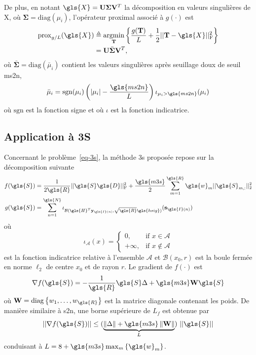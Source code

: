 De plus, en notant $\gls{X}=\mathbf{U}\boldsymbol{\Sigma} \mathbf{V}^T$ la décomposition en valeurs singulières de \gls{X}, où $\boldsymbol{\Sigma} = \mathrm{diag}(\mu_i)$, l'opérateur proximal associé à $g(\cdot)$ est~\cite{cai1956singular}
\begin{align}
    \mathrm{prox}_{g/L}(\gls{X}) &\triangleq \argmin_{\mathbf{T}} 
                                    \left\{ \frac{g(\mathbf{T})}{L} + \frac{1}{2}\frobnorm{\mathbf{T} - \gls{X}} \right\}\\
                               &= {\mathbf{U}} \bar{\boldsymbol{\Sigma}} {\mathbf{V}}^T,
\end{align}
où $\bar{\boldsymbol{\Sigma}} = \mathrm{diag}(\bar{\mu}_i)$ contient les valeurs singulières après seuillage doux de seuil \gls{ms2n}, \ie{}
\begin{equation}
    \bar{\mu}_i = \mathrm{sgn}(\mu_i)\left(|\mu_i|-\frac{\gls{ms2n}}{L}\right)\iota_{\mu_i>\gls{ms2n}}(\mu_i)
\end{equation}
où $\mathrm{sgn}$ est la fonction signe et où $\iota$ est la fonction indicatrice.


\subsection{Application à 3S}\label{subsec-implementation-3s}

Concernant le problème~\eqref{eq-3s}, la méthode \gls{3s} proposée repose sur la décomposition suivante
\begin{align}
    f(\gls{S}) &= 
    \frac{1}{2\gls{R}}\frobnorm{\gls{S} \gls{D}} + 
    \frac{\gls{m3s}}{2}\sum_{m=1}^{\gls{R}} \gls{w}_{m} \twonorm{\gls{S}_{m,:}}\\
    g(\gls{S}) &= 
    \sum_{n=1}^{\gls{N}} \iota_{
        \mathcal{B}(\gls{H}^T\mathbf{y}_{\gls{I}(n)},\sqrt{\gls{R}}\gls{hsig})
    }(\mathbf{s}_{\gls{I}(n)})
    \label{eq-3S_g}
\end{align}
où
\begin{equation}
    \iota_\mathcal{A}(x) = \left\{\begin{array}{lr}
    0,        & \text{if } x\in   \mathcal{A}\\
    +\infty, & \text{if } x\notin\mathcal{A}
    \end{array}\right.
\end{equation}
est la fonction indicatrice relative à l'ensemble $\mathcal{A}$ et $\mathcal{B}(x_0,r)$ est la boule fermée en norme $\ell_2$ de centre $x_0$ et de rayon $r$.
Le gradient de $f(\cdot)$ est
\begin{equation}
    \nabla f(\gls{S}) = -\frac{1}{\gls{R}} \gls{S}\Delta + \gls{m3s}\mathbf{W}\gls{S}\\
\end{equation}
où $\mathbf{W}=\mathrm{diag}\left\{w_1,\ldots,w_{\gls{R}}\right\}$ est la matrice diagonale contenant les poids.
De manière similaire à \gls{s2n}, une borne supérieure de $L_f$ est obtenue par
\begin{equation}
||\nabla f(\gls{S})|| \leq 
(\underbrace{\left\|\Delta\right\| + \gls{m3s}\left\|\mathbf{W}\right\|}_{L})
\ ||\gls{S}||
\end{equation}
conduisant à $L = 8+\gls{m3s}\max_{m}\left\{\gls{w}_{m}\right\}$.

